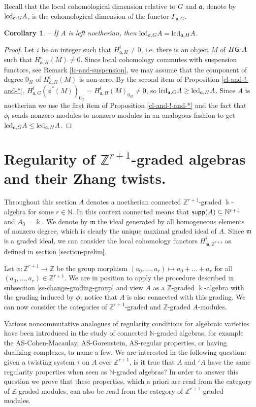 \documentclass[twoside,11pt]{article}
\newcommand{\lcd}{{\rm lcd}}
\renewcommand{\k}{\Bbbk}
\newcommand{\N}{{\mathbb N}}
\newcommand{\Z}{{\mathbb Z}}
\newcommand{\GG}{{\Gamma}}
\newcommand{\m}{{\mathfrak m}}
\renewcommand{\a}{{\mathfrak a}}
\newcommand{\GrMod}{{\sf Gr}}
\newcommand{\supp}{{\sf supp}}
\newtheorem{subcorollary}[subtheorem]{Corollary}
\begin{document}
Recall that the local cohomological dimension relative to $G$ and $\a$, denote by
$\lcd_{\a,G} A$, is the cohomological dimension of the functor $\GG_{\a, G}$.
\begin{subcorollary} -- 
\label{lcd-group-change}
If $A$ is left noetherian, then $\lcd_{\a,G} A =\lcd_{\a,H} A$.
\end{subcorollary}

\begin{proof}
Let $i$ be an integer such that $H_{\a,H} ^i \neq 0$, i.e. there is an object
$M$ of $H\GrMod A $ such that $H_{\a,H}^i(M) \neq 0$. Since local cohomology commutes
with suspension functors, see Remark \ref{lc-and-suspension}, we may assume that the
component of degree $0_H$ of $H_{\a,H}^i(M)$ is non-zero. By the second item of
Proposition \ref{cl-and-!-and-*}, $H_{\a,G}^i(\phi^*(M))_{0_G} = H_{\a,H}^i(M)_{0_H} \neq
0$, so $\lcd_{\a,G} A \geq \lcd_{\a,H} A$. Since $A$ is noetherian we use the first item
of Proposition \ref{cl-and-!-and-*} and the fact that $\phi_!$ sends nonzero modules to
nonzero modules in an analogous fashion to get $\lcd_{\a,G} A  \leq \lcd_{\a,H} A$.  
\end{proof}

\section{Regularity of $\Z^{r+1}$-graded algebras and their Zhang
twists.}\label{section-regularity-grading-twist}

Throughout this section $A$ denotes a noetherian connected $\Z^{r+1}$-graded $\k$-algebra
for some $r\in\N$. In this context connected means that $\supp(A) \subseteq \N^{r+1}$ and
$A_{0} = \k$. We denote by $\m$ the ideal generated by all homogeneous elements of nonzero
degree, which is clearly the unique maximal graded ideal of $A$. Since $\m$ is a graded
ideal, we can consider the local cohomology functors $H_{\m, \Z^{r+1}}^i$ as defined in
section \ref{section-prelim}.

Let $\phi: \Z^{r+1} \to \Z$ be the group morphism $(a_0, \ldots, a_r) \mapsto a_0 + \ldots
+ a_r$ for all $(a_0, \ldots, a_r) \in\Z^{r+1}$. We are in position to apply the procedure
described in subsection \ref{ss-change-grading-group} and view $A$ as a $\Z$-graded
$\k$-algebra with the grading induced by $\phi$; notice that $A$ is also connected
with this grading. We can now consider the categories of $\Z^{r+1}$-graded and $\Z$-graded
$A$-modules.

Various noncommutative analogues of regularity conditions for algebraic varieties have been
introduced in the study of connected $\N$-graded algebras, for example the
AS-Cohen-Macaulay, AS-Gorenstein, AS-regular properties, or having dualizing complexes, to
name a few. We are interested in the following question: given a twisting system $\tau$ on
$A$ over $\Z^{r+1}$, is it true that $A$ and ${}^\tau A$ have the same regularity
properties when seen as $\N$-graded algebras? In order to answer this question we prove
that these properties, which a priori are read from the category of $\Z$-graded modules,
can also be read from the category of $\Z^{r+1}$-graded modules.
\end{document}
